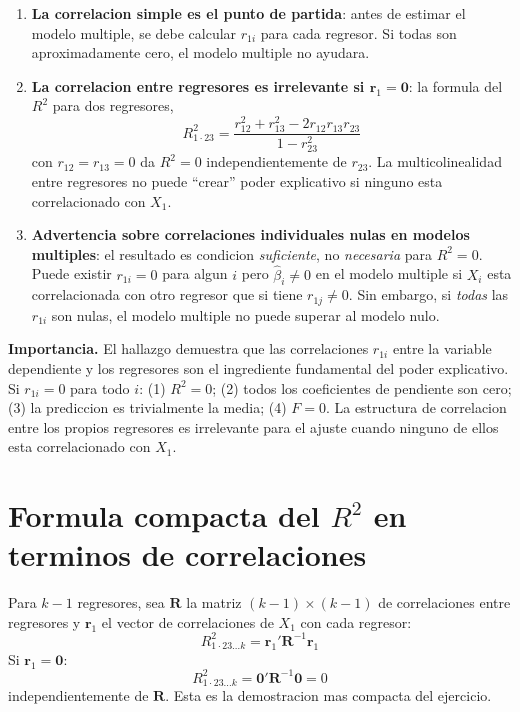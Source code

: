 \documentclass[12pt, letterpaper]{article}
\theoremstyle{remark}\newtheorem{obs}{Observacion}
\begin{document}
\begin{enumerate}[leftmargin=1.8em, itemsep=5pt]
  \item \textbf{La correlacion simple es el punto de partida}: antes de estimar
    el modelo multiple, se debe calcular $r_{1i}$ para cada regresor. Si todas son
    aproximadamente cero, el modelo multiple no ayudara.

  \item \textbf{La correlacion entre regresores es irrelevante si $\mathbf{r}_1 = \mathbf{0}$}:
    la formula del $R^2$ para dos regresores,
    \begin{equation}
      R^2_{1\cdot 23} = \frac{r_{12}^2 + r_{13}^2 - 2r_{12}r_{13}r_{23}}{1 - r_{23}^2}
    \end{equation}
    con $r_{12} = r_{13} = 0$ da $R^2 = 0$ independientemente de $r_{23}$.
    La multicolinealidad entre regresores no puede ``crear'' poder explicativo
    si ninguno esta correlacionado con $X_1$.

  \item \textbf{Advertencia sobre correlaciones individuales nulas en modelos multiples}:
    el resultado es condicion \emph{suficiente}, no \emph{necesaria} para $R^2 = 0$.
    Puede existir $r_{1i} = 0$ para algun $i$ pero $\hat\beta_i \neq 0$ en el modelo
    multiple si $X_i$ esta correlacionada con otro regresor que si tiene $r_{1j} \neq 0$.
    Sin embargo, si \emph{todas} las $r_{1i}$ son nulas, el modelo multiple no puede
    superar al modelo nulo.
\end{enumerate}

\begin{clave}
  \textbf{Importancia.} El hallazgo demuestra que las correlaciones $r_{1i}$ entre
  la variable dependiente y los regresores son el ingrediente fundamental del poder
  explicativo. Si $r_{1i} = 0$ para todo $i$: (1) $R^2 = 0$; (2) todos los coeficientes
  de pendiente son cero; (3) la prediccion es trivialmente la media; (4) $F = 0$.
  La estructura de correlacion entre los propios regresores es irrelevante para el
  ajuste cuando ninguno de ellos esta correlacionado con $X_1$.
\end{clave}

\appendix

\section{Formula compacta del $R^2$ en terminos de correlaciones}

Para $k-1$ regresores, sea $\mathbf{R}$ la matriz $(k-1)\times(k-1)$ de correlaciones
entre regresores y $\mathbf{r}_1$ el vector de correlaciones de $X_1$ con cada regresor:
\begin{equation}
  R^2_{1\cdot 23\ldots k} = \mathbf{r}_1'\mathbf{R}^{-1}\mathbf{r}_1
\end{equation}
Si $\mathbf{r}_1 = \mathbf{0}$:
\begin{equation}
  R^2_{1\cdot 23\ldots k} = \mathbf{0}'\mathbf{R}^{-1}\mathbf{0} = 0
\end{equation}
independientemente de $\mathbf{R}$. Esta es la demostracion mas compacta del ejercicio.
\end{document}
